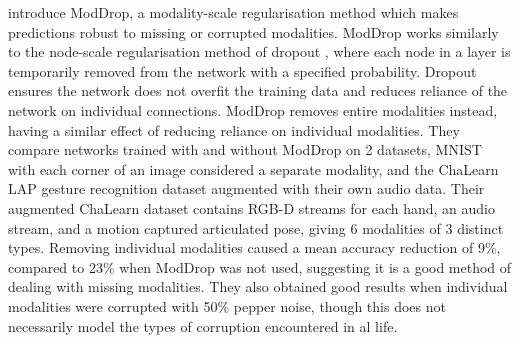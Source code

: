 \cite{ModDrop} introduce ModDrop, a modality-scale regularisation method which makes predictions robust to missing or corrupted modalities. ModDrop works similarly to the node-scale regularisation method of dropout \cite{dropout}, where each node in a layer is temporarily removed from the network with a specified probability. Dropout ensures the network does not overfit the training data and reduces reliance of the network on individual connections. ModDrop removes entire modalities instead, having a similar effect of reducing reliance on individual modalities. 
They compare networks trained with and without ModDrop on 2 datasets, MNIST with each corner of an image considered a separate modality, and the ChaLearn LAP gesture recognition dataset augmented with their own audio data. Their augmented ChaLearn dataset contains RGB-D streams for each hand, an audio stream, and a motion captured articulated pose, giving 6 modalities of 3 distinct types. Removing individual modalities caused a mean accuracy reduction of 9\%, compared to 23\% when ModDrop was not used, suggesting it is a good method of dealing with missing modalities. They also obtained good results when individual modalities were corrupted with 50\% pepper noise, though this does not necessarily model the types of corruption encountered in al life.
